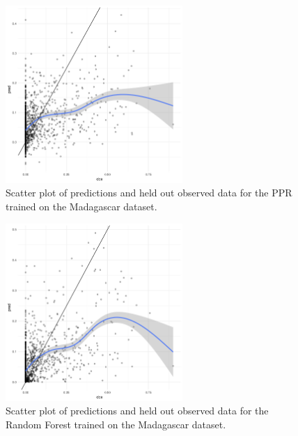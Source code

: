 \documentclass[review]{elsarticle}
\begin{document}
\begin{figure}[h!]
  \centering
  \includegraphics[width=0.6\textwidth]{figs/SI/ppr_obspred_mdg.png}
\caption{
  Scatter plot of predictions and held out observed data for the PPR trained on the Madagascar dataset.
}

\end{figure}


\begin{figure}[h!]
  \centering
  \includegraphics[width=0.6\textwidth]{figs/SI/ranger_obspred_mdg.png}
\caption{
  Scatter plot of predictions and held out observed data for the Random Forest trained on the Madagascar dataset.
}

\end{figure}
\end{document}

